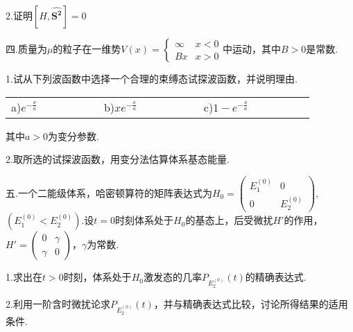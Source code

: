 \documentclass[UTF8]{ctexart}
\begin{document}
2.证明$\left[H,\boldsymbol{\hat{S^{2}}}\right]=0$



四.质量为$\mu$的粒子在一维势$V\left(x\right)=\begin{cases}
\infty & x<0\\
Bx & x>0
\end{cases}$中运动，其中$B>0$是常数.

1.试从下列波函数中选择一个合理的束缚态试探波函数，并说明理由.

\begin{tabular}{cccccccccccccccccc}
a)$e^{-\frac{x}{a}}$ &  &  &  &  &  & b)$xe^{-\frac{x}{a}}$ &  &  &  &  &  & c)$1-e^{-\frac{x}{a}}$ &  &  &  &  & \\
\end{tabular}

其中$a>0$为变分参数.

2.取所选的试探波函数，用变分法估算体系基态能量.


五.一个二能级体系，哈密顿算符的矩阵表达式为$H_{0}=\left(\begin{array}{cc}
E_{1}^{\left(0\right)} & 0\\
0 &
E_{2}^{\left(0\right)}\end{array}\right)$,$\left(E_{1}^{\left(0\right)}<E_{2}^{\left(0\right)}\right)$.设$t=0$时刻体系处于$H_0$的基态上，后受微扰$H'$的作用，$H'=\left(\begin{array}{cc}
0 & \gamma\\
\gamma & 0
\end{array}\right)$，$\gamma$为常数.

1.求出在$t>0$时刻，体系处于$H_{0}$激发态的几率$P_{E_{2}^{\left(0\right)}}\left(t\right)$的精确表达式.

2.利用一阶含时微扰论求$P_{E_{2}^{\left(0\right)}}\left(t\right)$，并与精确表达式比较，讨论所得结果的适用条件.

\thispagestyle{empty}
\end{document}
